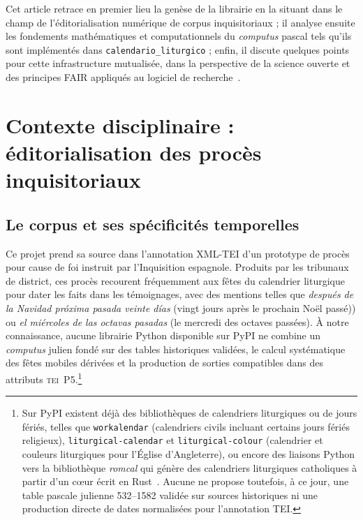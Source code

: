 \documentclass[final, fra]{anthology-ch}     %
\begin{document}
Cet article retrace en premier lieu la genèse de la librairie en la situant dans le champ de l'éditorialisation numérique de corpus inquisitoriaux ; il analyse ensuite les fondements mathématiques et computationnels du \textit{computus} pascal tels qu'ils sont implémentés dans \texttt{calendario\_liturgico} ; enfin, il discute quelques points pour cette infrastructure mutualisée, dans la perspective de la science ouverte et des principes FAIR appliqués au logiciel de recherche~\cite{chuehong2022}.

\section{Contexte disciplinaire : éditorialisation des procès inquisitoriaux} \label{sec:contexte}

\subsection{Le corpus et ses spécificités temporelles} \label{sec:corpus}

Ce projet prend sa source dans l'annotation XML-TEI d'un prototype de procès pour cause de foi instruit par l'Inquisition espagnole. Produits par les tribunaux de district, ces procès recourent fréquemment aux fêtes du calendrier liturgique pour dater les faits dans les témoignages, avec des mentions telles que \textit{después de la Navidad próxima pasada veinte días} (\og vingt jours après le prochain Noël passé\fg{})) ou \textit{el miércoles de las octavas pasadas} (\og le mercredi des octaves passées\fg{}). À notre connaissance, aucune librairie Python disponible sur PyPI ne combine un \textit{computus} julien fondé sur des tables historiques validées, le calcul systématique des fêtes mobiles dérivées et la production de sorties compatibles dans des attributs \textsc{tei}~P5.\footnote{Sur PyPI existent déjà des bibliothèques de calendriers liturgiques ou de jours fériés, telles que \texttt{workalendar} (calendriers civils incluant certains jours fériés religieux), \texttt{liturgical-calendar} et \texttt{liturgical-colour} (calendrier et couleurs liturgiques pour l’Église d’Angleterre), ou encore des liaisons Python vers la bibliothèque \textit{romcal} qui génère des calendriers liturgiques catholiques à partir d’un cœur écrit en Rust~\cite{Bordworkalendar,Gazeley-liturgical-cal,Magnie-romcal}. Aucune ne propose toutefois, à ce jour, une table pascale julienne 532--1582 validée sur sources historiques ni une production directe de dates normalisées pour l’annotation TEI.}
\end{document}
